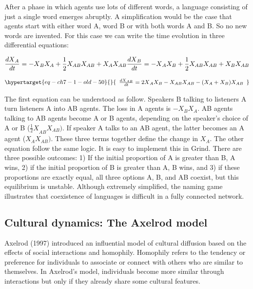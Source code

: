 \documentclass[
  a4paper,
  DIV=11,
  numbers=noendperiod]{scrreprt}
\begin{document}
After a phase in which agents use lots of different words, a language
consisting of just a single word emerges abruptly. A simplification
would be the case that agents start with either word A, word B or with
both words A and B. So no new words are invented. For this case we can
write the time evolution in three differential equations:

\[{\frac{{dX}_{A}}{dt} = {- X}_{B}X_{A} + {\frac{1}{2}}X_{AB}X_{AB} + X_{A}X_{AB}
}\\{\frac{{dX}_{B}}{dt} = {- X}_{A}X_{B} + {\frac{1}{2}}X_{AB}X_{AB} + X_{B}X_{AB}}\]

\begin{equation}\protect\hypertarget{eq-ch7-1-old-50}{}{\begin{array}{r}
\frac{{dX}_{AB}}{dt} = {2X}_{A}X_{B} - X_{AB}X_{AB} - (X_{A}+ X_{B})X_{AB}
\end{array}}\label{eq-ch7-1-old-50}\end{equation}

The first equation can be understood as follow. Speakers B talking to
listeners A turn listeners A into AB agents. The loss in A agents is
\({- X}_{B}X_{A}\). AB agents talking to AB agents become A or B agents,
depending on the speaker's choice of A or B
(\({\frac{1}{2}X}_{AB}X_{AB})\). If speaker A talks to an AB agent, the
latter becomes an A agent (\(X_{A}X_{AB})\). These three terms together
define the change in \(X_{A}.\) The other equation follow the same
logic. It is easy to implement this in Grind. There are three possible
outcomes: 1) If the initial proportion of A is greater than B, A wins,
2) if the initial proportion of B is greater than A, B wins, and 3) if
these proportions are exactly equal, all three options A, B, and AB
coexist, but this equilibrium is unstable. Although extremely
simplified, the naming game illustrates that coexistence of languages is
difficult in a fully connected network.

\hypertarget{sec-Cultural-dynamics-The-Axelrod-model}{%
\subsection{Cultural dynamics: The Axelrod
model}\label{sec-Cultural-dynamics-The-Axelrod-model}}

Axelrod (1997) introduced an influential model of cultural diffusion
based on the effects of social interactions and homophily. Homophily
refers to the tendency or preference for individuals to associate or
connect with others who are similar to themselves. In Axelrod's model,
individuals become more similar through interactions but only if they
already share some cultural features.
\end{document}
